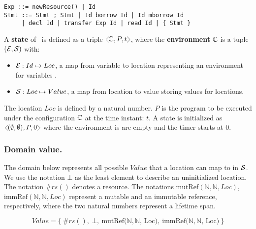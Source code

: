 \begin{lstlisting}[caption=\osld~abstract syntax,style=deno,label=lst:didactic-syntax]
Exp ::= newResource() | Id
Stmt ::= Stmt ; Stmt | Id borrow Id | Id mborrow Id
     | decl Id | transfer Exp Id | read Id | { Stmt }
\end{lstlisting}

\begin{definition}
A \textbf{state} of \osld~is defined as a triple $\cfg{\confosl , P, t }$, where the \textbf{environment} $\mathbb{C}$ is a tuple $(\mathcal{E},\mathcal{S})$ with:
\begin{itemize}[noitemsep]
    \item[] $\mathcal{E}:Id\mapsto Loc$, a map from variable to location representing an environment for variables .
    \item[] $\mathcal{S}:Loc\mapsto Value$, a map from location to value storing values for locations.
\end{itemize}
The location $Loc$ is defined by a natural number. $P$ is the program to be executed under the configuration $\mathbb{C}$ at the time instant: $t$.
A state is initialized as $\cfg{(\emptyset,\emptyset),P, 0}$ where the environment is are empty and the timer starts at 0.
\end{definition} 

\subsubsection{Domain value.}

The domain below represents all possible $Value$ that a location can map to in $\mathcal{S}$.
We use the notation $\bot$ as the least element to describe an uninitialized location.
The notation $\#rs()$ denotes a resource. The notations $\text{mutRef}(\mathbb{N}, \mathbb{N}, Loc)$,
$\text{immRef}(\mathbb{N}, \mathbb{N}, Loc)$ represent a mutable and an immutable reference, respectively,
where the two natural numbers represent a lifetime span.

\begin{equation*}
    Value = \Big\{~\#rs(),~ \bot,~ \text{mutRef($\mathbb{N}, \mathbb{N}$, Loc)},~ \text{immRef($\mathbb{N}, \mathbb{N}$, Loc)}~\Big\}
    \label{eqn:value-d}
\end{equation*}

